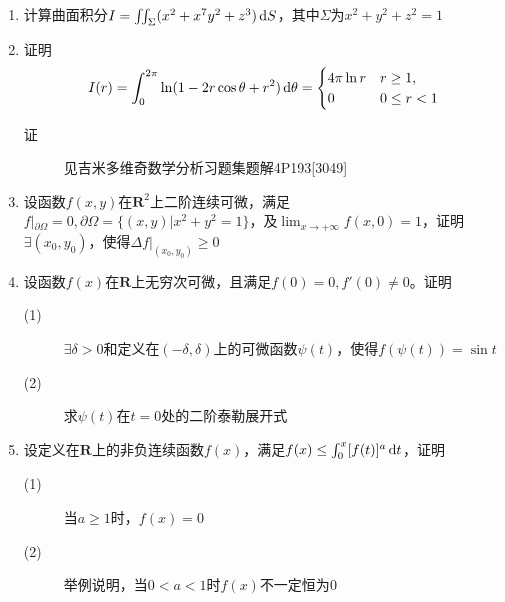 \begin{enumerate}
\item 计算曲面积分$I=\iint_{\Sigma}(x^2+x^7y^2+z^3)\,\mathrm{d} S$，其中$\Sigma$为$x^2+y^2+z^2=1$

\item 证明
\[
I(r)=\int_0^{2\pi} \ln(1-2r\cos\theta+r^2)\,\mathrm{d} \theta =
\begin{cases}
4\pi \ln r & r \geq 1,\\
0 & 0\leq r <1
\end{cases}
\]
\begin{description}
\item[证] 见吉米多维奇数学分析习题集题解4P193[3049]
\end{description}

\item 设函数$f(x,y)$在$\mathbf{R}^2$上二阶连续可微，满足$f|_{\partial \Omega}=0,\partial \Omega=\{(x,y)|x^2+y^2=1\}$，及$\lim_{x \to +\infty}f(x,0)=1$，证明$\exists (x_0,y_0)$，使得$\Delta f|_{(x_0,y_0)}\geq 0$


\item 设函数$f(x)$在$\mathbf{R}$上无穷次可微，且满足$f(0)=0,f'(0)\neq 0$。证明
\begin{description}
\item[(1)] $\exists \delta > 0$和定义在$(-\delta ,\delta)$上的可微函数$\psi(t)$，使得$f(\psi(t))=\sin t$
\item[(2)] 求$\psi(t)$在$t=0$处的二阶泰勒展开式
\end{description}

\item 设定义在$\mathbf{R}$上的非负连续函数$f(x)$，满足$f(x)\leq\int_0^x[f(t)]^a\,\mathrm{d} t$，证明
\begin{description}
\item[(1)] 当$a\geq 1$时，$f(x)=0$
\item[(2)] 举例说明，当$0<a<1$时$f(x)$不一定恒为$0$
\end{description}














\end{enumerate}